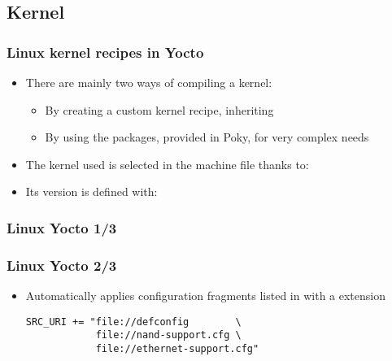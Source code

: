 \subsection{Kernel}

\begin{frame}
  \frametitle{Linux kernel recipes in Yocto}
  \begin{itemize}
    \item There are mainly two ways of compiling a kernel:
      \begin{itemize}
        \item By creating a custom kernel recipe, inheriting
        \item By using the  packages, provided in
          Poky, for very complex needs
      \end{itemize}
    \item The kernel used is selected in the machine file thanks to:
    \item Its version is defined with:
  \end{itemize}
\end{frame}

\begin{frame}[fragile]
  \frametitle{Linux Yocto 1/3}
\end{frame}

\begin{frame}[fragile]
  \frametitle{Linux Yocto 2/3}
  \begin{itemize}
    \item Automatically applies configuration fragments listed in
           with a  extension
      \begin{block}{}
        \begin{verbatim}
SRC_URI += "file://defconfig        \
            file://nand-support.cfg \
            file://ethernet-support.cfg"
        \end{verbatim}
      \end{block}
  \end{itemize}
\end{frame}

